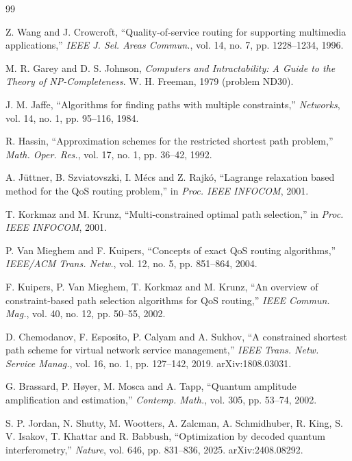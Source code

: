 \documentclass[journal]{IEEEtran}
\begin{document}
\begin{thebibliography}{99}
\footnotesize

Z. Wang and J. Crowcroft, ``Quality-of-service routing for supporting multimedia applications,'' \emph{IEEE J. Sel. Areas Commun.}, vol. 14, no. 7, pp. 1228--1234, 1996.

M. R. Garey and D. S. Johnson, \emph{Computers and Intractability: A Guide to the Theory of NP-Completeness}. W. H. Freeman, 1979 (problem ND30).

J. M. Jaffe, ``Algorithms for finding paths with multiple constraints,'' \emph{Networks}, vol. 14, no. 1, pp. 95--116, 1984.

R. Hassin, ``Approximation schemes for the restricted shortest path problem,'' \emph{Math. Oper. Res.}, vol. 17, no. 1, pp. 36--42, 1992.

A. Jüttner, B. Szviatovszki, I. Mécs and Z. Rajkó, ``Lagrange relaxation based method for the QoS routing problem,'' in \emph{Proc. IEEE INFOCOM}, 2001.

T. Korkmaz and M. Krunz, ``Multi-constrained optimal path selection,'' in \emph{Proc. IEEE INFOCOM}, 2001.

P. Van Mieghem and F. Kuipers, ``Concepts of exact QoS routing algorithms,'' \emph{IEEE/ACM Trans. Netw.}, vol. 12, no. 5, pp. 851--864, 2004.

F. Kuipers, P. Van Mieghem, T. Korkmaz and M. Krunz, ``An overview of constraint-based path selection algorithms for QoS routing,'' \emph{IEEE Commun. Mag.}, vol. 40, no. 12, pp. 50--55, 2002.

D. Chemodanov, F. Esposito, P. Calyam and A. Sukhov, ``A constrained shortest path scheme for virtual network service management,'' \emph{IEEE Trans. Netw. Service Manag.}, vol. 16, no. 1, pp. 127--142, 2019. arXiv:1808.03031.

G. Brassard, P. Høyer, M. Mosca and A. Tapp, ``Quantum amplitude amplification and estimation,'' \emph{Contemp. Math.}, vol. 305, pp. 53--74, 2002.

S. P. Jordan, N. Shutty, M. Wootters, A. Zalcman, A. Schmidhuber, R. King, S. V. Isakov, T. Khattar and R. Babbush, ``Optimization by decoded quantum interferometry,'' \emph{Nature}, vol. 646, pp. 831--836, 2025. arXiv:2408.08292.


\end{thebibliography}
\end{document}
